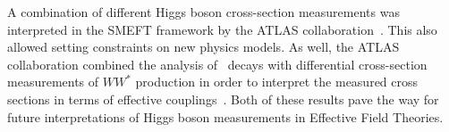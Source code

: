 A combination of different Higgs boson cross-section measurements was interpreted in the SMEFT framework by the ATLAS collaboration~\cite{ATLAS-CONF-2020-053}. This also allowed setting constraints on new physics models.
As well, the ATLAS collaboration combined the analysis of \HWW\ decays with differential cross-section measurements of $WW^*$ production in order to interpret the measured cross sections in terms of effective couplings~\cite{ATL-PHYS-PUB-2021-010}.
Both of these results pave the way for future interpretations of Higgs boson measurements in Effective Field Theories. %








